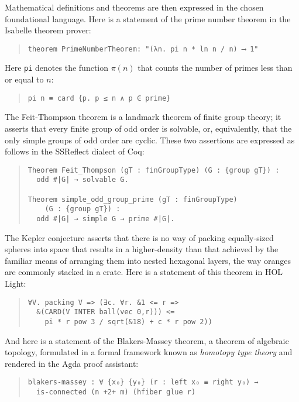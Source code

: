 \documentclass[12pt]{article}
\begin{document}
Mathematical definitions and theorems are then expressed in the chosen foundational language. Here is a statement of the prime number theorem in the Isabelle theorem prover:
\begin{quote}\begin{lstlisting}
theorem PrimeNumberTheorem: "(λn. pi n * ln n / n) ⟶ 1" 
\end{lstlisting}\end{quote}
Here \texttt{pi} denotes the function $\pi(n)$ that counts the number of primes less than or equal to $n$:
\begin{quote}\begin{lstlisting}
pi n ≡ card {p. p ≤ n ∧ p ∈ prime} 
\end{lstlisting}\end{quote}
The Feit-Thompson theorem is a landmark theorem of finite group theory; it asserts that every finite group of odd order is solvable, or, equivalently, that the only simple groups of odd order are cyclic. These two assertions are expressed as follows in the SSReflect dialect of Coq:
\begin{quote}\begin{lstlisting}
Theorem Feit_Thompson (gT : finGroupType) (G : {group gT}) :
  odd #|G| → solvable G.

Theorem simple_odd_group_prime (gT : finGroupType) 
    (G : {group gT}) :
  odd #|G| → simple G → prime #|G|. 
\end{lstlisting}\end{quote}
The Kepler conjecture asserts that there is no way of packing equally-sized spheres into space that results in a higher-density than that achieved by the familiar means of arranging them into nested hexagonal layers, the way oranges are commonly stacked in a crate. Here is a statement of this theorem in HOL Light:
\begin{quote}\begin{lstlisting}
∀V. packing V => (∃c. ∀r. &1 <= r => 
  &(CARD(V INTER ball(vec 0,r))) <=
    pi * r pow 3 / sqrt(&18) + c * r pow 2))
\end{lstlisting}\end{quote}
And here is a statement of the Blakers-Massey theorem, a theorem of algebraic topology, formulated in a formal framework known as \emph{homotopy type theory} and rendered in the Agda proof assistant:
\begin{quote}\begin{lstlisting}
blakers-massey : ∀ {x₀} {y₀} (r : left x₀ ≡ right y₀) → 
  is-connected (n +2+ m) (hfiber glue r)
\end{lstlisting}\end{quote}
\end{document}
